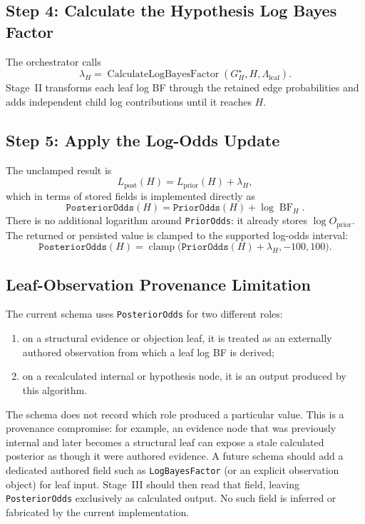 \documentclass[11pt]{article}
\newcommand{\BF}{\operatorname{BF}}
\begin{document}
\subsection{Step 4: Calculate the Hypothesis Log Bayes Factor}

The orchestrator calls
\[
    \lambda_H
      =\operatorname{CalculateLogBayesFactor}
        (G_H^{\star},H,\Lambda_{\mathrm{leaf}}).
\]
Stage~II transforms each leaf log BF through the retained edge probabilities
and adds independent child log contributions until it reaches \(H\).

\subsection{Step 5: Apply the Log-Odds Update}

The unclamped result is
\[
    L_{\mathrm{post}}(H)
      =L_{\mathrm{prior}}(H)+\lambda_H,
\]
which in terms of stored fields is implemented directly as
\[
    \texttt{PosteriorOdds}(H)
      =\texttt{PriorOdds}(H)+\log\BF_H.
\]
There is no additional logarithm around \texttt{PriorOdds}: it already stores
\(\log O_{\mathrm{prior}}\).  The returned or persisted value is clamped to
the supported log-odds interval:
\[
    \texttt{PosteriorOdds}(H)
      =\operatorname{clamp}
        \bigl(\texttt{PriorOdds}(H)+\lambda_H,-100,100\bigr).
\]

\subsection{Leaf-Observation Provenance Limitation}

The current schema uses \texttt{PosteriorOdds} for two different roles:

\begin{enumerate}
    \item on a structural evidence or objection leaf, it is treated as an
          externally authored observation from which a leaf log BF is
          derived;
    \item on a recalculated internal or hypothesis node, it is an output
          produced by this algorithm.
\end{enumerate}

The schema does not record which role produced a particular value.  This is a
provenance compromise: for example, an evidence node that was previously
internal and later becomes a structural leaf can expose a stale calculated
posterior as though it were authored evidence.  A future schema should add a
dedicated authored field such as \texttt{LogBayesFactor} (or an explicit
observation object) for leaf input.  Stage~III should then read that field,
leaving \texttt{PosteriorOdds} exclusively as calculated output.  No such
field is inferred or fabricated by the current implementation.
\end{document}
